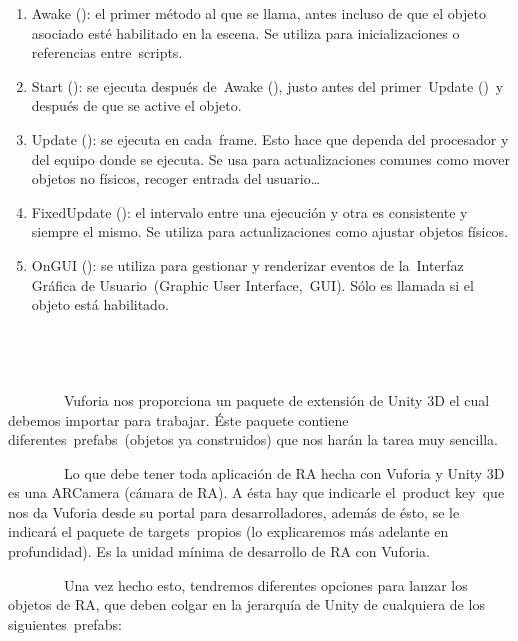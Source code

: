 \begin{enumerate}
\def\labelenumi{\arabic{enumi}.}
\itemsep1pt\parskip0pt
\item
  Awake (): el primer método al que se llama, antes incluso de que el
  objeto asociado esté habilitado en la escena. Se utiliza para
  inicializaciones o referencias entre~scripts.
\item
  Start (): se ejecuta después de~Awake (), justo antes del
  primer~Update ()~y después de que se active el objeto.
\item
  Update (): se ejecuta en cada~frame. Esto hace que dependa del
  procesador y del equipo donde se ejecuta. Se usa para actualizaciones
  comunes como mover objetos no físicos, recoger entrada del
  usuario\ldots{}
\item
  FixedUpdate (): el intervalo entre una ejecución y otra es consistente
  y siempre el mismo. Se utiliza para actualizaciones como ajustar
  objetos físicos.
\item
  OnGUI (): se utiliza para gestionar y renderizar eventos de
  la~Interfaz Gráfica de Usuario~(Graphic User Interface,~GUI). Sólo es
  llamada si el objeto está habilitado.
\end{enumerate}

\subsection{~~~~~~~~}\label{section}


~~~~~~~~Vuforia nos proporciona un paquete de extensión de Unity 3D el
cual debemos importar para trabajar. Éste paquete contiene
diferentes~prefabs~(objetos ya construidos) que nos harán la tarea muy
sencilla.

~~~~~~~~Lo que debe tener toda aplicación de RA hecha con Vuforia y
Unity 3D es una ARCamera (cámara de RA). A ésta hay que indicarle
el~product key~que nos da Vuforia desde su portal para desarrolladores,
además de ésto, se le indicará el paquete de targets~propios (lo
explicaremos más adelante en profundidad). Es la unidad mínima de
desarrollo de RA con Vuforia.

~~~~~~~~Una vez hecho esto, tendremos diferentes opciones para lanzar
los objetos de RA, que deben colgar en la jerarquía de Unity de
cualquiera de los siguientes~prefabs:

